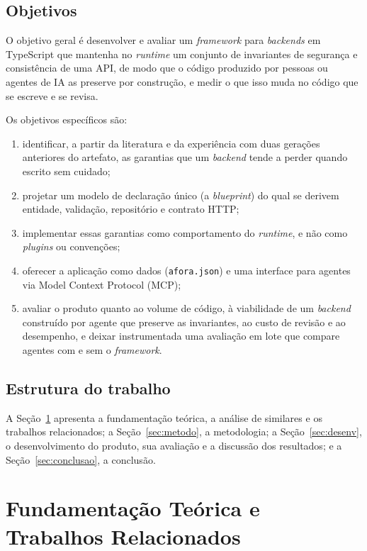 \documentclass[a4paper,12pt]{article}
\newcommand{\estr}[1]{\textit{#1}}
\begin{document}
\subsection{Objetivos}\label{sec:objetivos}

O objetivo geral é desenvolver e avaliar um \estr{framework} para \estr{backends} em TypeScript que mantenha no \estr{runtime} um conjunto de invariantes de segurança e consistência de uma API, de modo que o código produzido por pessoas ou agentes de IA as preserve por construção, e medir o que isso muda no código que se escreve e se revisa.

Os objetivos específicos são:
\begin{enumerate}
  \item identificar, a partir da literatura e da experiência com duas gerações anteriores do artefato, as garantias que um \estr{backend} tende a perder quando escrito sem cuidado;
  \item projetar um modelo de declaração único (a \estr{blueprint}) do qual se derivem entidade, validação, repositório e contrato HTTP;
  \item implementar essas garantias como comportamento do \estr{runtime}, e não como \estr{plugins} ou convenções;
  \item oferecer a aplicação como dados (\texttt{afora.json}) e uma interface para agentes via Model Context Protocol (MCP);
  \item avaliar o produto quanto ao volume de código, à viabilidade de um \estr{backend} construído por agente que preserve as invariantes, ao custo de revisão e ao desempenho, e deixar instrumentada uma avaliação em lote que compare agentes com e sem o \estr{framework}.
\end{enumerate}

\subsection{Estrutura do trabalho}

A Seção~\ref{sec:fund} apresenta a fundamentação teórica, a análise de similares e os trabalhos relacionados; a Seção~\ref{sec:metodo}, a metodologia; a Seção~\ref{sec:desenv}, o desenvolvimento do produto, sua avaliação e a discussão dos resultados; e a Seção~\ref{sec:conclusao}, a conclusão.

\section{Fundamentação Teórica e Trabalhos Relacionados}\label{sec:fund}
\end{document}
